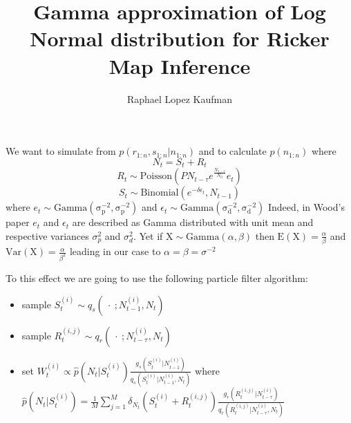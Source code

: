 \documentclass{article}
\title{Gamma approximation of Log Normal distribution for Ricker Map Inference}
\author{Raphael Lopez Kaufman}
\date{}
\begin{document}
	We want to simulate from $p(r_{1:n}, s_{1:n} | n_{1:n})$ and to calculate $p(n_{1:n})$ where
	\begin{equation*}
		N_t = S_t + R_t
	\end{equation*}
	\begin{equation*}
		R_t \sim \mathrm{Poisson}(PN_{t-\tau}e^{\frac{N_{t-\tau}}{N_0}}e_t)
	\end{equation*}
	\begin{equation*}
	S_t \sim \mathrm{Binomial}(e^{-\delta\epsilon_t}, N_{t-1})
	\end{equation*}
	where $e_t \sim \mathrm{Gamma(\sigma_p^{-2}, \sigma_p^{-2})}$ and $\epsilon_t \sim \mathrm{Gamma(\sigma_d^{-2}, \sigma_d^{-2})}$ Indeed, in Wood's paper $e_t$ and $\epsilon_t$ are described as Gamma distributed with unit mean and respective variances $\sigma_p^2$ and $\sigma_d^2$. Yet if $\mathrm{X} \sim \mathrm{Gamma}(\alpha, \beta)$ then $\mathrm{E}(\mathrm{X}) = \frac{\alpha}{\beta}$ and $\mathrm{Var}(\mathrm{X}) = \frac{\alpha}{\beta^2}$ leading in our case to $\alpha=\beta=\sigma^{-2}$
	
	To this effect we are going to use the following particle filter algorithm:
	\begin{itemize}
		\item sample $S_t^{(i)} \sim q_s(\ \cdot \ ; N_{t-1}^{(i)}, N_t)$
		\item sample $R_t^{(i,j)} \sim q_r(\ \cdot \ ; N_{t-\tau}^{(i)}, N_t)$
		\item set $W_t^{(i)} \propto \hat{p}(N_t |S_t^{(i)})\frac{g_s(S_t^{(i)} | N_{t-1}^{(i)})}{q_s(S_t^{(i)} | N_{t-1}^{(i)}, N_t)}$
		where $\hat{p}(N_t |S_t^{(i)}) = \frac{1}{M}\sum_{j=1}^{M}\delta_{N_t}(S_t^{(i)}+R_t^{(i,j)})\frac{g_r(R_t^{(i,j)} | N_{t-\tau}^{(i)})}{q_r( R_t^{(i,j)}| N_{t-\tau}^{(i)}, N_t)}$
	\end{itemize}
	
\end{document}
